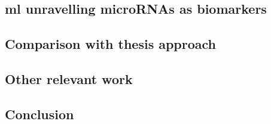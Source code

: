 \subsection{\gls{ml} unravelling microRNAs as biomarkers}

\subsection{Comparison with thesis approach}

\subsection{Other relevant work}

\subsection{Conclusion}